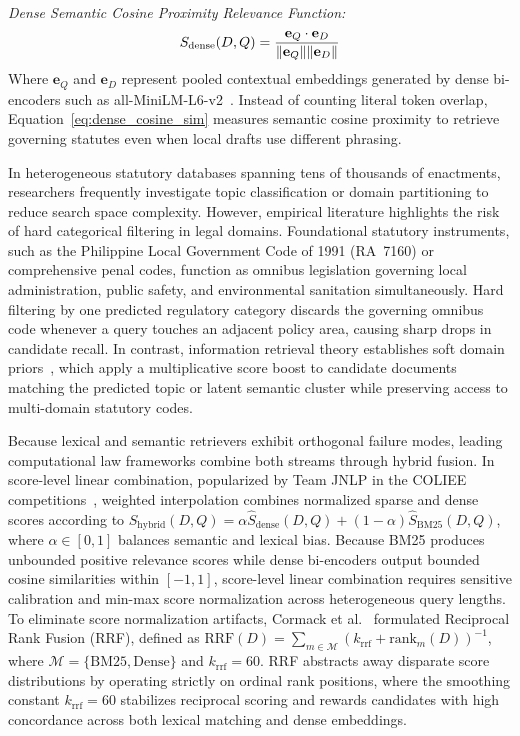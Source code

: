     \noindent\textit{Dense Semantic Cosine Proximity Relevance Function:}
    \begin{equation}
        S_{\text{dense}}(D, Q) = \frac{\mathbf{e}_Q \cdot \mathbf{e}_D}{\|\mathbf{e}_Q\| \|\mathbf{e}_D\|}
        \label{eq:dense_cosine_sim}
        \eqcaption{Dense Semantic Cosine Proximity Relevance Function}
    \end{equation}
    \noindent Where $\mathbf{e}_Q$ and $\mathbf{e}_D$ represent pooled contextual embeddings generated by dense bi-encoders such as all-MiniLM-L6-v2~\cite{reimers2019sentencebert}. Instead of counting literal token overlap, Equation~\eqref{eq:dense_cosine_sim} measures semantic cosine proximity to retrieve governing statutes even when local drafts use different phrasing.

    In heterogeneous statutory databases spanning tens of thousands of enactments, researchers frequently investigate topic classification or domain partitioning to reduce search space complexity. However, empirical literature highlights the risk of hard categorical filtering in legal domains. Foundational statutory instruments, such as the Philippine Local Government Code of 1991 (RA~7160) or comprehensive penal codes, function as omnibus legislation governing local administration, public safety, and environmental sanitation simultaneously. Hard filtering by one predicted regulatory category discards the governing omnibus code whenever a query touches an adjacent policy area, causing sharp drops in candidate recall. In contrast, information retrieval theory establishes soft domain priors~\cite{robertson2009probabilistic}, which apply a multiplicative score boost to candidate documents matching the predicted topic or latent semantic cluster while preserving access to multi-domain statutory codes.

    Because lexical and semantic retrievers exhibit orthogonal failure modes, leading computational law frameworks combine both streams through hybrid fusion. In score-level linear combination, popularized by Team JNLP in the COLIEE competitions~\cite{goebel2026an}, weighted interpolation combines normalized sparse and dense scores according to $S_{\text{hybrid}}(D, Q) = \alpha \hat{S}_{\text{dense}}(D, Q) + (1 - \alpha) \hat{S}_{\text{BM25}}(D, Q)$, where $\alpha \in [0, 1]$ balances semantic and lexical bias. Because BM25 produces unbounded positive relevance scores while dense bi-encoders output bounded cosine similarities within $[-1, 1]$, score-level linear combination requires sensitive calibration and min-max score normalization across heterogeneous query lengths. To eliminate score normalization artifacts, Cormack et al.~\cite{cormack2009reciprocal} formulated Reciprocal Rank Fusion (RRF), defined as $\text{RRF}(D) = \sum_{m \in \mathcal{M}} (k_{\text{rrf}} + \text{rank}_m(D))^{-1}$, where $\mathcal{M} = \{\text{BM25}, \text{Dense}\}$ and $k_{\text{rrf}} = 60$. RRF abstracts away disparate score distributions by operating strictly on ordinal rank positions, where the smoothing constant $k_{\text{rrf}} = 60$ stabilizes reciprocal scoring and rewards candidates with high concordance across both lexical matching and dense embeddings.

